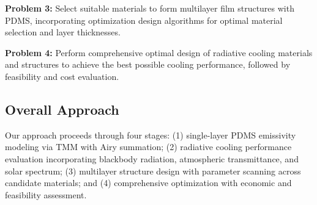 \textbf{Problem 3:} Select suitable materials to form multilayer film structures with PDMS, incorporating optimization design algorithms for optimal material selection and layer thicknesses.

\textbf{Problem 4:} Perform comprehensive optimal design of radiative cooling materials and structures to achieve the best possible cooling performance, followed by feasibility and cost evaluation.

\subsection{Overall Approach}

Our approach proceeds through four stages: (1) single-layer PDMS emissivity modeling via TMM with Airy summation; (2) radiative cooling performance evaluation incorporating blackbody radiation, atmospheric transmittance, and solar spectrum; (3) multilayer structure design with parameter scanning across candidate materials; and (4) comprehensive optimization with economic and feasibility assessment.

